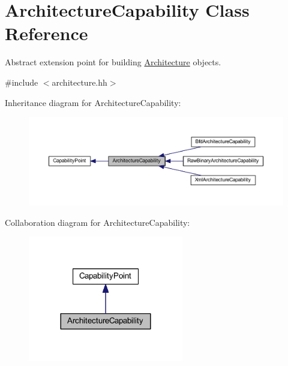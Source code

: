 \hypertarget{class_architecture_capability}{}\section{Architecture\+Capability Class Reference}
\label{class_architecture_capability}


Abstract extension point for building \mbox{\hyperlink{class_architecture}{Architecture}} objects.  




{\ttfamily \#include $<$architecture.\+hh$>$}



Inheritance diagram for Architecture\+Capability\+:
\nopagebreak
\begin{figure}[H]
\begin{center}
\leavevmode
\includegraphics[width=350pt]{class_architecture_capability__inherit__graph}
\end{center}
\end{figure}


Collaboration diagram for Architecture\+Capability\+:
\nopagebreak
\begin{figure}[H]
\begin{center}
\leavevmode
\includegraphics[width=192pt]{class_architecture_capability__coll__graph}
\end{center}
\end{figure}
